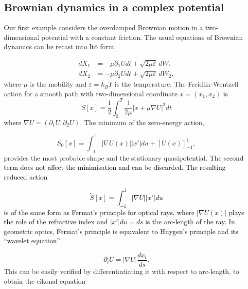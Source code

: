 \subsection{Brownian dynamics in a complex potential}

Our first example considers the overdamped Brownian motion in a two-dimensional
potential with a constant friction. The usual equations of Brownian
dynamics can be recast into Itô form,

\begin{align*}
dX_{1} & =-\mu\partial_{1}Udt+\sqrt{2\mu\varepsilon}\,dW_{1}\\
dX_{2} & =-\mu\partial_{2}Udt+\sqrt{2\mu\varepsilon}\,dW_{2},
\end{align*}
where $\mu$ is the mobility and $\varepsilon=k_{B}T$ is the temperature.
The Freidlin-Wentzell action for a smooth path with two-dimensional
coordinate $x=(x_{1},x_{2})$ is
\[
S[x]=\frac{1}{2}\int_{0}^{T}\frac{1}{2\mu}|\dot{x}+\mu\nabla U|^{2}dt
\]
where $\nabla U=(\partial_{1}U,\partial_{2}U)$. The minimum of the
zero-energy action, 

\[
S_{0}[x]=\int_{-1}^{1}|\nabla U(x)||x'|du+\left[U(x)\right]_{-1}^{1},
\]
provides the most probable shape and the stationary quasipotential.
\textcolor{black}{The second term does not affect the minimisation
and can be discarded. The resulting reduced action}

\textcolor{black}{
\begin{equation}
\tilde{S}[x]=\int_{-1}^{1}|\nabla U||x'|du\label{eq:fermat}
\end{equation}
is of the same form as Fermat's principle for optical rays, where
$|\nabla U(x)|$ plays the role of the refractive index and $|x'|du=ds$
is the arc-length of the ray. In geometric optics, Fermat's principle
is equivalent to Huygen's principle and its ``wavelet equation''}

\textcolor{black}{
\begin{equation}
\partial_{i}U=|\nabla U|\frac{dx_{i}}{ds}.\label{eq:huygen}
\end{equation}
}This can be easily verified by differentiatiating it with respect
to arc-length, to obtain the eikonal equation

